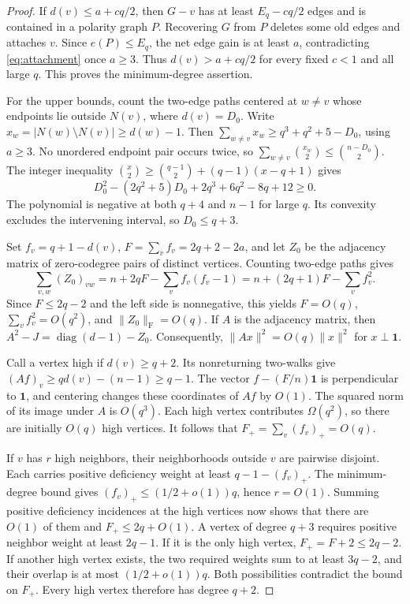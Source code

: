 \documentclass[11pt,reqno]{amsart}
\theoremstyle{definition}
\theoremstyle{remark}
\numberwithin{equation}{section}
\DeclareMathOperator{\diag}{diag}
\newcommand{\one}{\mathbf 1}
\begin{document}
\begin{proof}
If $d(v)\le a+cq/2$, then $G-v$ has at least $E_q-cq/2$ edges and is
contained in a polarity graph $P$. Recovering $G$ from $P$ deletes
some old edges and attaches $v$. Since $e(P)\le E_q$, the net edge
gain is at least $a$, contradicting \eqref{eq:attachment} once
$a\ge3$. Thus $d(v)>a+cq/2$ for every fixed $c<1$ and all large $q$.
This proves the minimum-degree assertion.

For the upper bounds, count the two-edge paths centered at $w\ne v$
whose endpoints lie outside $N(v)$, where $d(v)=D_0$. Write
$x_w=|N(w)\setminus N(v)|\ge d(w)-1$. Then
$\sum_{w\ne v}x_w\ge q^3+q^2+5-D_0$, using $a\ge3$.
No unordered endpoint pair occurs twice, so
$\sum_{w\ne v}\binom{x_w}2\le\binom{n-D_0}2$.
The integer inequality
$\binom{x}2\ge\binom{q-1}2+(q-1)(x-q+1)$ gives
\[
 D_0^2-(2q^2+5)D_0+2q^3+6q^2-8q+12\ge0.
\]
The polynomial is negative at both $q+4$ and $n-1$ for large $q$.
Its convexity excludes the intervening interval, so $D_0\le q+3$.

Set $f_v=q+1-d(v)$, $F=\sum_v f_v=2q+2-2a$, and let $Z_0$ be the
adjacency matrix of zero-codegree pairs of distinct vertices. Counting
two-edge paths gives
\[
 \sum_{v,w}(Z_0)_{vw}
   =n+2qF-\sum_v f_v(f_v-1)
   =n+(2q+1)F-\sum_v f_v^2.
\]
Since $F\le2q-2$ and the left side is nonnegative, this yields
$F=O(q)$, $\sum_v f_v^2=O(q^2)$, and $\|Z_0\|_{\mathrm F}=O(q)$.
If $A$ is the adjacency matrix, then
$A^2-J=\diag(d-1)-Z_0$. Consequently,
$\|Ax\|^2=O(q)\|x\|^2$ for $x\perp\one$.

Call a vertex high if $d(v)\ge q+2$. Its nonreturning two-walks give
$(Af)_v\ge qd(v)-(n-1)\ge q-1$.
The vector $f-(F/n)\one$ is perpendicular to $\one$, and centering
changes these coordinates of $Af$ by $O(1)$.
The squared norm of its image under $A$ is $O(q^3)$. Each high vertex
contributes $\Omega(q^2)$, so there are initially $O(q)$ high vertices.
It follows that $F_+=\sum_v(f_v)_+=O(q)$.

If $v$ has $r$ high neighbors, their neighborhoods outside $v$ are
pairwise disjoint. Each carries positive deficiency weight at least
$q-1-(f_v)_+$. The minimum-degree bound gives
$(f_v)_+\le(1/2+o(1))q$, hence $r=O(1)$.
Summing positive deficiency incidences at the high vertices now shows
that there are $O(1)$ of them and $F_+\le2q+O(1)$.
A vertex of degree $q+3$ requires positive neighbor weight at least
$2q-1$. If it is the only high vertex, $F_+=F+2\le2q-2$.
If another high vertex exists, the two required weights sum to at least
$3q-2$, and their overlap is at most $(1/2+o(1))q$.
Both possibilities contradict the bound on $F_+$.
Every high vertex therefore has degree $q+2$.
\end{proof}
\end{document}

